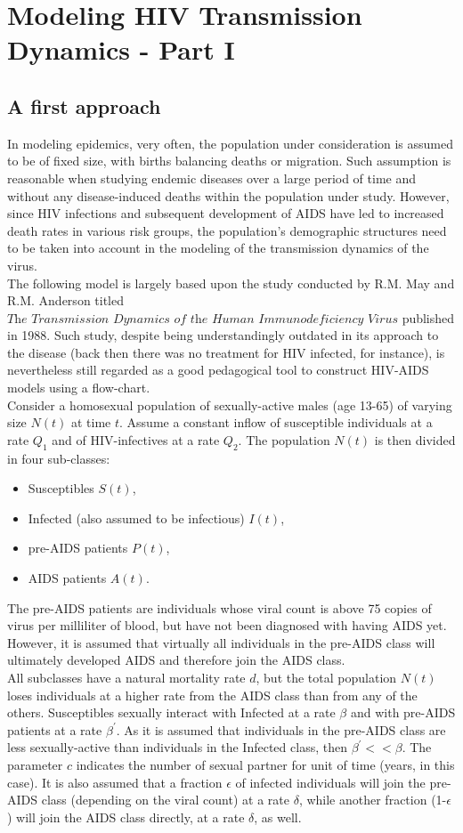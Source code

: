 \section{Modeling HIV Transmission Dynamics - Part I}

\subsection{A first approach}
In modeling epidemics, very often, the population under consideration is assumed to be of fixed size, with births balancing deaths or migration. Such assumption is reasonable when studying endemic diseases over a large period of time and without any disease-induced deaths within the population under study. However, since HIV infections and subsequent development of AIDS have led to increased death rates in various risk groups, the population's demographic structures need to be taken into account in the modeling of the transmission dynamics of the virus.\\
The following model is largely based upon the study conducted by R.M. May and R.M. Anderson titled $\textit{The Transmission Dynamics of the Human Immunodeficiency Virus}$ published in 1988. Such study, despite being understandingly outdated in its approach to the disease (back then there was no treatment for HIV infected, for instance), is nevertheless still regarded as a good pedagogical tool to construct HIV-AIDS models using a flow-chart.\\
Consider a homosexual population of sexually-active males (age 13-65) of varying size $N(t)$ at time $t$. Assume a constant inflow of susceptible individuals at a rate $Q_{1}$ and of HIV-infectives at a rate $Q_{2}$. The population $N(t)$ is then divided in four sub-classes: 
\begin{itemize}
\item Susceptibles $S(t)$, 
\item Infected (also assumed to be infectious) $I(t)$, 
\item pre-AIDS patients $P(t)$,
\item AIDS patients $A(t)$. 
\end{itemize}
The pre-AIDS patients are individuals whose viral count is above 75 copies of virus per milliliter of blood, but have not been diagnosed with having AIDS yet. However, it is assumed that virtually all individuals in the pre-AIDS class will ultimately developed AIDS and therefore join the AIDS class.\\
All subclasses have a natural mortality rate $d$, but the total population $N(t)$ loses individuals at a higher rate from the AIDS class than from any of the others. Susceptibles sexually interact with Infected at a rate $\beta$ and with pre-AIDS patients at a rate $\beta^{\prime}$. As it is assumed that individuals in the pre-AIDS class are less sexually-active than individuals in the Infected class, then $\beta^{\prime} << \beta$. The parameter $c$ indicates the number of sexual partner for unit of time (years, in this case). It is also assumed that a fraction $\epsilon$ of infected individuals will join the pre-AIDS class (depending on the viral count) at a rate $\delta$, while another fraction (1-$\epsilon$) will join the AIDS class directly, at a rate $\delta$, as well.
